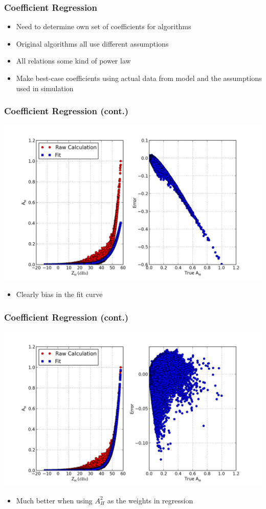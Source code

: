 \documentclass[red]{beamer}
\begin{document}
\begin{frame}[<+->]
	\frametitle{Coefficient Regression}
	\begin{itemize}
		\item Need to determine own set of coefficients for algorithms
		\item Original algorithms all use different assumptions
		\item All relations some kind of power law
		\item Make best-case coefficients using actual data from model and
		the assumptions used in simulation
	\end{itemize}
\end{frame}

\begin{frame}
	\frametitle{Coefficient Regression (cont.)}
	\begin{center}
		\includegraphics[scale=0.35]{figures/basic_power_law.png}
	\end{center}
	\begin{itemize}
		\item Clearly bias in the fit curve
	\end{itemize}
\end{frame}

\begin{frame}
	\frametitle{Coefficient Regression (cont.)}
	\begin{center}
		\includegraphics[scale=0.35]{figures/weighted_power_law.png}
	\end{center}
	\begin{itemize}
		\item Much better when using $A_H^2$ as the weights in regression
	\end{itemize}
\end{frame}
\end{document}
